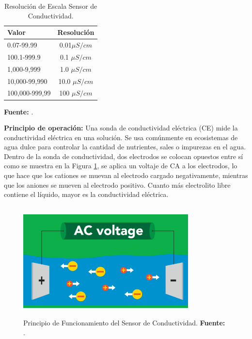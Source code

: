 \begin{table}[t]
    
    \protect\caption[Resolución de Escala Sensor de Conductividad]{Resolución de Escala Sensor de Conductividad.}\label{tab:resol_ce}
    \centering
    \begin{tabular}{ l c }
         \toprule
         \textbf{Valor}&\textbf{Resolución}  \\
         \midrule
         0.07-99.99 & 0.01$ \mu S/cm$ \\
         100.1-999.9 & 0.1 $\mu S/cm $\\
         1,000-9,999 & 1.0 $\mu S/cm$ \\
         10,000-99,990 & 10.0 $\mu S/cm $\\
         100,000-999,99 & 100 $\mu S/cm$ \\
        \bottomrule
    \end{tabular}
   \vspace{5mm}
   \newline
    \textbf{Fuente: }\cite{ezoce}.
\end{table}

\textbf{Principio de operación: }
Una sonda de conductividad eléctrica (CE) mide la conductividad eléctrica en una solución. Se usa comúnmente en ecosistemas de agua dulce para controlar la cantidad de nutrientes, sales o impurezas en el agua.
Dentro de la sonda de conductividad, dos electrodos se colocan opuestos entre sí como se muestra en la Figura \ref{fig:4.14}, se aplica un voltaje de CA a los electrodos, lo que hace que los cationes se muevan al electrodo cargado negativamente, mientras que los aniones se mueven al electrodo positivo. Cuanto más electrolito libre contiene el líquido, mayor es la conductividad eléctrica.

\begin{figure}[ht]
    \centering
    \includegraphics[width=90mm, height=60mm]{Imagenes/2021/imag37.png}
    \caption[Principio de Funcionamiento del Sensor de Conductividad]{Principio de Funcionamiento del Sensor de Conductividad. \textbf{Fuente: }\cite{ezoce}.}
    \label{fig:4.14}
\end{figure}

